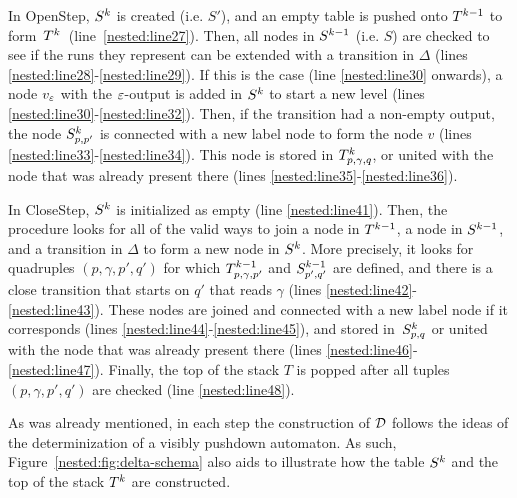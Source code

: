 In {\sc OpenStep}, $S^k$ is created (i.e. $S'$), and an empty table is pushed onto $T^{k-1}$ to form~$T^k$~(line~\ref{nested:line27}). 
Then, all nodes in $S^{k-1}$ (i.e. $S$) are checked to see if the runs they represent can be extended with a transition in $\Delta$ (lines \ref{nested:line28}-\ref{nested:line29}). 
If this is the case (line \ref{nested:line30} onwards), a node $v_\varepsilon$  with the $\varepsilon$-output is added in $S^k$ to start a new level (lines \ref{nested:line30}-\ref{nested:line32}). 
Then, if the transition had a non-empty output, the node $S^k_{p,p'}$ is connected with a new label node to form the node $v$ (lines \ref{nested:line33}-\ref{nested:line34}). 
This node is stored in $T^k_{p,\gamma,q}$, or united with the node that was already present there (lines \ref{nested:line35}-\ref{nested:line36}).

In {\sc CloseStep}, $S^k$ is initialized as empty (line \ref{nested:line41}). 
Then, the procedure looks for all of the valid ways to join a node in $T^{k-1}$, a node in $S^{k-1}$, and a transition in $\Delta$ to form a new node in $S^k$. 
More precisely, it looks for quadruples $(p,\gamma,p',q')$ for which $T^{k-1}_{p,\gamma,p'}$ and $S^{k-1}_{p',q'}$ are defined, and there is a close transition that starts on $q'$ that reads $\gamma$ (lines \ref{nested:line42}-\ref{nested:line43}). 
These nodes are joined and connected with a new label node if it corresponds (lines \ref{nested:line44}-\ref{nested:line45}), and stored in~$S^k_{p,q}$ or united with the node that was already present there (lines \ref{nested:line46}-\ref{nested:line47}). Finally, the top of the stack $T$ is popped after all tuples $(p,\gamma,p',q')$ are checked (line \ref{nested:line48}).

As was already mentioned, in each step the construction of $\mathcal{D}$ follows the ideas of the determinization of a visibly pushdown automaton.
As such, Figure~\ref{nested:fig:delta-schema} also aids to illustrate how the table $S^k$ and the top of the stack $T^k$ are constructed.


